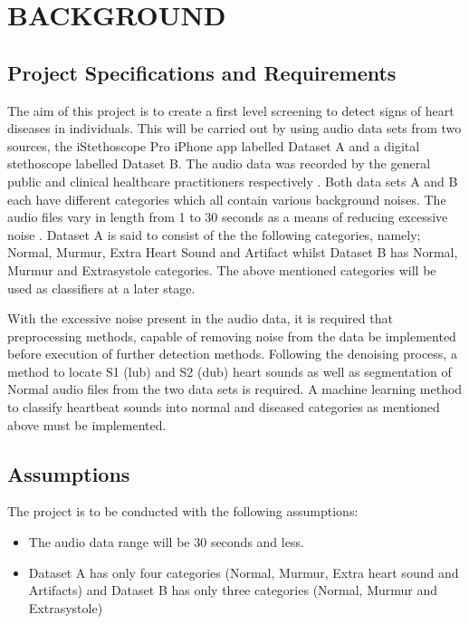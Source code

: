 \documentclass[10pt,twocolumn]{witseiepaper}
\begin{document}
\section{BACKGROUND}
\subsection{Project Specifications and Requirements}
\label{PSR}
The aim of this project is to create a first level screening to detect signs of heart diseases in individuals. This will be carried out by using audio data sets from two sources, the iStethoscope Pro iPhone app labelled Dataset A and a digital stethoscope labelled Dataset B. The audio data was recorded by the general public and clinical healthcare practitioners respectively \cite{pascal}. Both data sets A and B each have different categories which all contain various background noises. The audio files vary in length from 1 to 30 seconds as a means of reducing excessive noise \cite{pascal}. Dataset A is said to consist of the the following categories, namely; Normal, Murmur, Extra Heart Sound and Artifact whilst Dataset B has Normal, Murmur and Extrasystole categories. The above mentioned categories will be used as classifiers at a later stage.

With the excessive noise present in the audio data, it is required that preprocessing methods, capable of removing noise from the data be implemented before execution of further detection methods. Following the denoising process, a method to locate S1 (lub) and S2 (dub) heart sounds as well as segmentation of Normal audio files from the two data sets is required. A machine learning method to classify heartbeat sounds into normal and diseased categories as mentioned above must be implemented.

\subsection{Assumptions}
The project is to be conducted with the following assumptions:

\begin{itemize}
    \item The audio data range will be 30 seconds and less.
    \item Dataset A has only four categories (Normal, Murmur, Extra heart sound and Artifacts) and Dataset B has only three categories (Normal, Murmur and Extrasystole)
\end{itemize}
\end{document}
